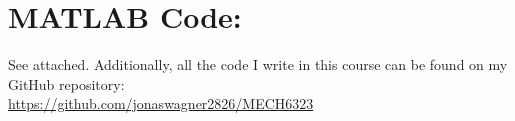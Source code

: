\documentclass[letter]{article}
\numberwithin{equation}{section}
\begin{document}
\newpage
\appendix
\section{MATLAB Code:}\label{apx:matlab}
See attached.
Additionally, all the code I write in this course can be found on my GitHub repository:\\
\href{https://github.com/jonaswagner2826/MECH6323}{https://github.com/jonaswagner2826/MECH6323}

% 
\end{document}
